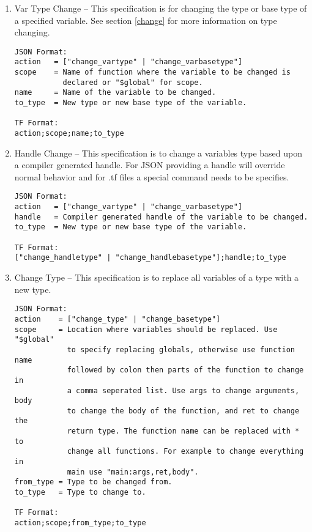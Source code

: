 \documentclass[natbib]{article}
\begin{document}
\begin{enumerate}
\item{} Var Type Change -- This specification is for changing the type or base type 
of a specified variable. See section \ref{change} for more information on type changing.

\begin{verbatim}
JSON Format:
action   = ["change_vartype" | "change_varbasetype"]
scope    = Name of function where the variable to be changed is 
           declared or "$global" for scope.
name     = Name of the variable to be changed.
to_type  = New type or new base type of the variable.

TF Format:
action;scope;name;to_type
\end{verbatim}

\item{} Handle Change -- This specification is to change a variables type based upon 
a compiler generated handle. For JSON providing a handle will override normal behavior 
and for .tf files a special command needs to be specifies.

\begin{verbatim}
JSON Format:
action   = ["change_vartype" | "change_varbasetype"]
handle   = Compiler generated handle of the variable to be changed.
to_type  = New type or new base type of the variable.

TF Format:
["change_handletype" | "change_handlebasetype"];handle;to_type
\end{verbatim}

\item{} Change Type -- This specification is to replace all variables of a type with a new type.

\begin{verbatim}
JSON Format:
action    = ["change_type" | "change_basetype"]
scope     = Location where variables should be replaced. Use "$global" 
            to specify replacing globals, otherwise use function name 
            followed by colon then parts of the function to change in 
            a comma seperated list. Use args to change arguments, body 
            to change the body of the function, and ret to change the 
            return type. The function name can be replaced with * to 
            change all functions. For example to change everything in 
            main use "main:args,ret,body".
from_type = Type to be changed from.
to_type   = Type to change to.

TF Format:
action;scope;from_type;to_type
\end{verbatim}


\end{enumerate}
\end{document}
